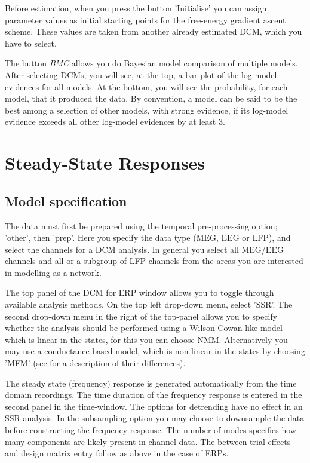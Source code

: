Before estimation, when you press the button 'Initialise' you can
assign parameter values as initial starting points for the free-energy
gradient ascent scheme. These values are taken from another already
estimated DCM, which you have to select. 

The button \textit{BMC} allows you do Bayesian model comparison of
multiple models. After selecting DCMs, you will see, at the top, a
bar plot of the log-model evidences for all models. At the bottom, you
will see the probability, for each model, that it produced the
data. By convention, a model can be said to be the best among a
selection of other models, with strong evidence, if its log-model
evidence exceeds all other log-model evidences by at least 3. 


\section{Steady-State Responses}

\subsection{Model specification}
The data must first be prepared using the temporal pre-processing option; 'other', then 'prep'. Here you specify the data type (MEG, EEG or LFP), and select the channels for a DCM analysis. In general you select all MEG/EEG channels and all or a subgroup of LFP channels from the areas you are interested in modelling as a network.

The top panel of the DCM for ERP window allows you to toggle through available analysis methods. On the top left drop-down menu, select 'SSR'. The second drop-down menu in the right of the top-panel allows you to specify whether the analysis should be performed using a Wilson-Cowan like model which is linear in the states, for this you can choose NMM. Alternatively you may use a conductance based model, which is non-linear in the states by choosing 'MFM' (see \cite{andre_sigmoid} for a description of their differences).
 
The steady state (frequency) response is generated automatically from the time domain recordings. The time duration of the frequency response is entered in the second panel in the time-window.  The options for detrending have no effect in an SSR analysis. In the subsampling option you may choose to downsample the data before constructing the frequency response. The number of modes specifies how many components are likely present in channel data. The between trial effects and design matrix entry follow as above in the case of ERPs.

